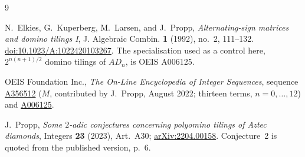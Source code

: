 \documentclass[11pt]{amsart}
\begin{document}
\begin{thebibliography}{9}

N.~Elkies, G.~Kuperberg, M.~Larsen, and J.~Propp,
\emph{Alternating-sign matrices and domino tilings I},
J. Algebraic Combin. \textbf{1} (1992), no.~2, 111--132.
\href{https://doi.org/10.1023/A:1022420103267}{doi:10.1023/A:1022420103267}.
The specialisation used as a control here, $2^{n(n+1)/2}$ domino tilings of
$AD_n$, is OEIS A006125.

OEIS Foundation Inc.,
\emph{The On-Line Encyclopedia of Integer Sequences},
sequence \href{https://oeis.org/A356512}{A356512} ($M$, contributed by
J.~Propp, August 2022; thirteen terms, $n=0,\dots,12$) and
\href{https://oeis.org/A006125}{A006125}.

J.~Propp,
\emph{Some $2$-adic conjectures concerning polyomino tilings of Aztec
diamonds},
Integers \textbf{23} (2023), Art.~A30;
\href{https://arxiv.org/abs/2204.00158}{arXiv:2204.00158}.
Conjecture~2 is quoted from the published version, p.~6.

\end{thebibliography}
\end{document}

